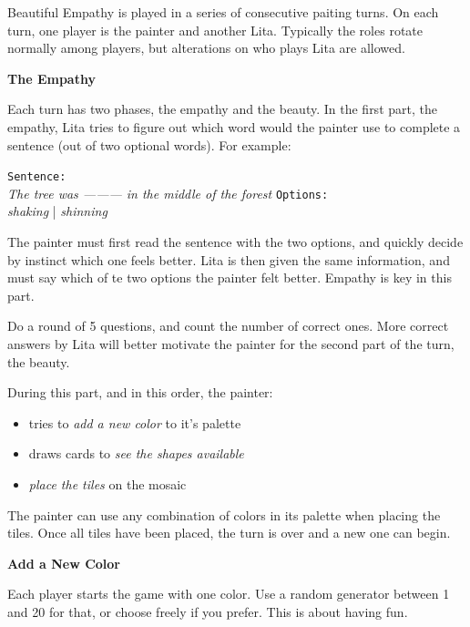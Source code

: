 \documentclass[twocolumn]{article}
\newcommand{\lvl}[1]{\vspace{0.5cm}\Large{\textbf{#1}}\vspace{0.2cm}}
\begin{document}
Beautiful Empathy is played in a series of consecutive paiting turns. On each turn, one player is the painter and another Lita. Typically the roles rotate normally among players, but alterations on who plays Lita are allowed. 

\vspace{1cm}
\lvl{The Empathy}

Each turn has two phases, the empathy and the beauty. In the first part, the empathy, Lita tries to figure out which word would the painter use to complete a sentence (out of two optional words). For example:

\begin{centering}
\texttt{Sentence:}\\
\textit{The tree was --------- in the middle of the forest}
\texttt{Options:}\\
\textit{shaking} | \textit{shinning}\\
\end{centering}
\vspace{0.5cm}

The painter must first read the sentence with the two options, and quickly decide by instinct which one feels better. Lita is then given the same information, and must say which of te two options the painter felt better. Empathy is key in this part.

Do a round of 5 questions, and count the number of correct ones. More correct answers by Lita will better motivate the painter for the second part of the turn, the beauty. 

During this part, and in this order, the painter:
\begin{itemize}
 \item tries to \textit{add a new color} to it's palette
 \item draws cards to \textit{see the shapes available}
 \item \textit{place the tiles} on the mosaic
\end{itemize}

The painter can use any combination of colors in its palette when placing the tiles. Once all tiles have been placed, the turn is over and a new one can begin.

\lvl{Add a New Color}

Each player starts the game with one color. Use a random generator between 1 and 20 for that, or choose freely if you prefer. This is about having fun.
\end{document}
